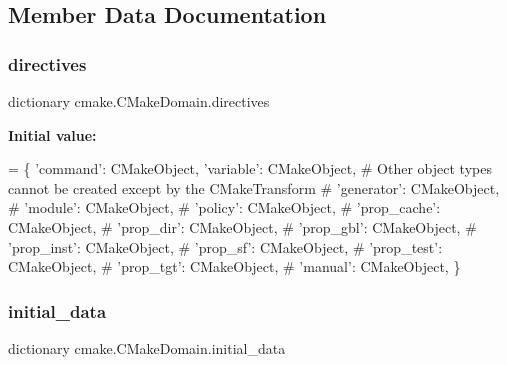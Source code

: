 \subsection{Member Data Documentation}
\mbox{\label{classcmake_1_1CMakeDomain_a4ca0cbe98eb3a38b98df30377f550c08}} 
\subsubsection{\texorpdfstring{directives}{directives}}
{\footnotesize\ttfamily dictionary cmake.\+C\+Make\+Domain.\+directives\hspace{0.3cm}{\ttfamily [static]}}

{\bfseries Initial value\+:}
\begin{DoxyCode}
=  \{
        \textcolor{stringliteral}{'command'}:    CMakeObject,
        \textcolor{stringliteral}{'variable'}:   CMakeObject,
        \textcolor{comment}{# Other object types cannot be created except by the CMakeTransform}
        \textcolor{comment}{# 'generator':  CMakeObject,}
        \textcolor{comment}{# 'module':     CMakeObject,}
        \textcolor{comment}{# 'policy':     CMakeObject,}
        \textcolor{comment}{# 'prop\_cache': CMakeObject,}
        \textcolor{comment}{# 'prop\_dir':   CMakeObject,}
        \textcolor{comment}{# 'prop\_gbl':   CMakeObject,}
        \textcolor{comment}{# 'prop\_inst':  CMakeObject,}
        \textcolor{comment}{# 'prop\_sf':    CMakeObject,}
        \textcolor{comment}{# 'prop\_test':  CMakeObject,}
        \textcolor{comment}{# 'prop\_tgt':   CMakeObject,}
        \textcolor{comment}{# 'manual':     CMakeObject,}
    \}
\end{DoxyCode}
\mbox{\label{classcmake_1_1CMakeDomain_a471a8473fff4f5b8a3eae45e5ca0eea7}} 
\subsubsection{\texorpdfstring{initial\+\_\+data}{initial\_data}}
{\footnotesize\ttfamily dictionary cmake.\+C\+Make\+Domain.\+initial\+\_\+data\hspace{0.3cm}{\ttfamily [static]}}

